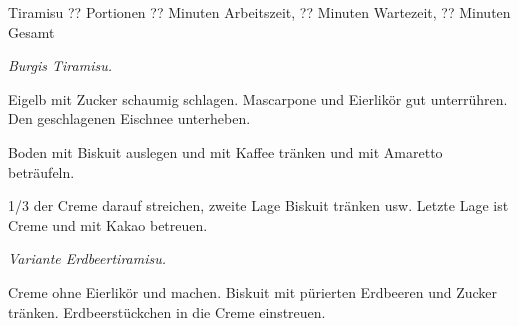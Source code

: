 \begin{recipe}{Tiramisu} {?? Portionen} {?? Minuten Arbeitszeit, ?? Minuten Wartezeit, ?? Minuten Gesamt}

  \freeform{}\textit{Burgis Tiramisu.}


  Eigelb mit Zucker schaumig schlagen.
  Mascarpone und Eierlikör gut unterrühren.
  Den geschlagenen Eischnee unterheben.

  \newstep{}Boden mit Biskuit auslegen und mit Kaffee tränken und mit Amaretto beträufeln.

  \newstep{}1/3 der Creme darauf streichen, zweite Lage Biskuit tränken usw.
  Letzte Lage ist Creme und mit Kakao betreuen.

  \freeform{}\hrulefill{}

  \freeform{}\textit{Variante Erdbeertiramisu.}


  Creme ohne Eierlikör und machen.
  Biskuit mit pürierten Erdbeeren und Zucker tränken.
  Erdbeerstückchen in die Creme einstreuen.

  \freeform{}\hrulefill{}

\end{recipe}
